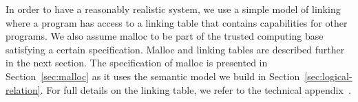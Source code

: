 \documentclass[format=acmsmall, review=true, screen=true]{acmart}
\renewcommand{\sectionname}{Section}
\newcommand{\itoplas}[1]%
    {{\color{OliveGreen} #1}}
\newcommand{\itoplassug}[1]{}
\begin{document}
In order to have a reasonably realistic system, we use a simple model of linking
where a program has access to a linking table that contains capabilities for
other programs. We also assume malloc to be part of the trusted computing base
satisfying a certain specification. Malloc and linking tables are described
further in the next section.
\itoplas{The specification of malloc is presented in \sectionname~\ref{sec:malloc} as it uses the semantic model we build in Section~\ref{sec:logical-relation}.
For full details on the linking table, we refer to the technical
appendix~\citep{technical_appendix}.} \itoplassug{(Reviewer A, esop suggest explaining the
  linking model)\\}
\itoplassug{Suggestion: We also have the flag table used
  for assertions, maybe we should add a description of it here.\\}
\end{document}
